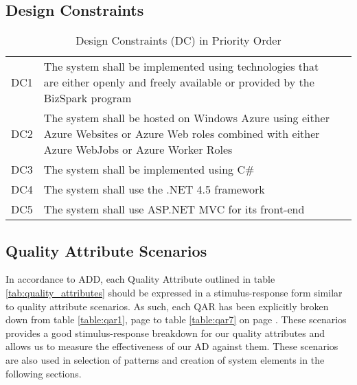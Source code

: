 \subsection{Design Constraints}
\begin{table}[!h]
\centering
\begin{tabularx}{\linewidth}{|l|X|l}
\cline{1-2}
DC1 & The system shall be implemented using technologies that are either openly and freely available or provided by the BizSpark program &   \\
DC2 & The system shall be hosted on Windows Azure using either Azure Websites or Azure Web roles combined with either Azure WebJobs or Azure Worker Roles &  \\
DC3 & The system shall be implemented using C\# &    \\
DC4 & The system  shall use the .NET 4.5 framework    \\
DC5 & The system shall use ASP.NET \index{ASP.NET} MVC for its front-end &    \\
\cline{1-2}
\end{tabularx}
\caption{Design Constraints (DC) in Priority Order}
\label{tab:design_constraints}
\end{table}


\subsection{Quality Attribute Scenarios}
In accordance to ADD, each Quality Attribute outlined in table \ref{tab:quality_attributes} should be expressed in a stimulus-response form similar to quality attribute scenarios. As such, each QAR has been explicitly broken down from table \ref{table:qar1}, page \pageref{table:qar1} to table \ref{table:qar7} on page \pageref{table:qar7}. These scenarios provides a good stimulus-response breakdown for our quality attributes and allows us to measure the effectiveness of our AD against them. These scenarios are also used in selection of patterns and creation of system elements in the following sections. 

